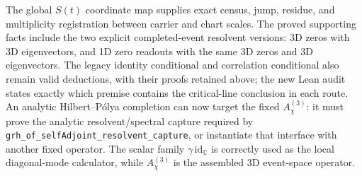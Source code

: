 The global \(S(t)\) coordinate map supplies exact census, jump, residue, and
multiplicity registration between carrier and chart scales.  The proved
supporting facts include the two explicit completed-event resolvent versions:
3D zeros with 3D eigenvectors, and 1D zero readouts with the same 3D zeros and
3D eigenvectors.  The legacy identity
conditional and correlation conditional also remain valid deductions, with
their proofs retained above; the new Lean audit states exactly which premise
contains the critical-line conclusion in each route.  An analytic
Hilbert--P\'olya completion can now target the fixed
\(A^{(3)}_\chi\): it must prove the analytic resolvent/spectral capture
required by \texttt{grh\_of\_selfAdjoint\_resolvent\_capture}, or
instantiate that interface with another fixed operator.  The scalar family
\(\gamma\,\mathrm{id}_{\mathbb C}\) is correctly used as the local
diagonal-mode calculator, while \(A^{(3)}_\chi\) is the assembled 3D
event-space operator.
